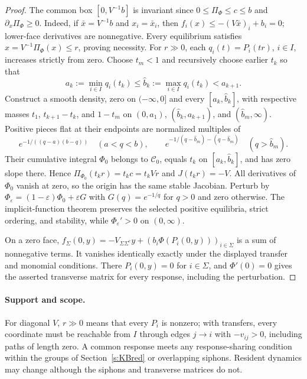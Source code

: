 \begin{proof}
The common box $[0,V^{-1}b]$ is invariant since
$0\le\Pi_\Phi\le c\le b$ and $\partial_x\Pi_\Phi\ge0$.
Indeed, if $\bar x=V^{-1}b$ and $x_i=\bar x_i$, then
$f_i(x)\le-(V\bar x)_i+b_i=0$; lower-face derivatives are nonnegative.
Every equilibrium satisfies $x=V^{-1}\Pi_\Phi(x)\le r$, proving necessity.
For $r\gg0$, each $q_i(t)=P_i(tr)$, $i\in I$, increases strictly from
zero. Choose $t_m<1$ and recursively choose earlier $t_k$ so that
\[
 a_k:=\min_{i\in I}q_i(t_k)\le \widehat b_k:=\max_{i\in I}q_i(t_k)<a_{k+1}.
\]
Construct a smooth density, zero on $(-\infty,0]$ and every $[a_k,\widehat b_k]$,
with respective masses $t_1$, $t_{k+1}-t_k$, and $1-t_m$ on
$(0,a_1)$, $(\widehat b_k,a_{k+1})$, and $(\widehat b_m,\infty)$.
Positive pieces flat at their endpoints are normalized multiples of
\[
 e^{-1/((q-a)(b-q))}\quad(a<q<b),\qquad
 e^{-1/(q-\widehat b_m)-(q-\widehat b_m)}\quad(q>\widehat b_m).
\]
Their cumulative integral $\Phi_0$ belongs to $\mathcal C_0$, equals
$t_k$ on $[a_k,\widehat b_k]$, and has zero slope there. Hence
$\Pi_{\Phi_0}(t_kr)=t_kc=t_kVr$ and $J(t_kr)=-V$.
All derivatives of $\Phi_0$ vanish at zero, so the origin has the same
stable Jacobian. Perturb by
$\Phi_\varepsilon=(1-\varepsilon)\Phi_0+\varepsilon G$ with
$G(q)=e^{-1/q}$ for $q>0$ and zero otherwise. The implicit-function
theorem preserves the selected positive equilibria, strict ordering,
and stability, while $\Phi_\varepsilon'>0$ on $(0,\infty)$.

On a zero face,
$f_\Sigma(0,y)=-V_{\Sigma\Sigma^c}y+
(b_i\Phi(P_i(0,y)))_{i\in\Sigma}$ is a sum of nonnegative terms.
It vanishes identically exactly under the displayed transfer and
monomial conditions. There $P_i(0,y)=0$ for $i\in\Sigma$, and
$\Phi'(0)=0$ gives the asserted transverse matrix for every response,
including the perturbation.
\end{proof}

\paragraph{Support and scope.}
For diagonal $V$, $r\gg0$ means that every $P_i$ is nonzero; with
transfers, every coordinate must be reachable from $I$ through edges
$j\to i$ with $-v_{ij}>0$, including paths of length zero.
A common response meets any response-sharing condition within the groups of Section~\ref{s:KBred}
or overlapping siphons. Resident dynamics may change although the
siphons and transverse matrices do not.

